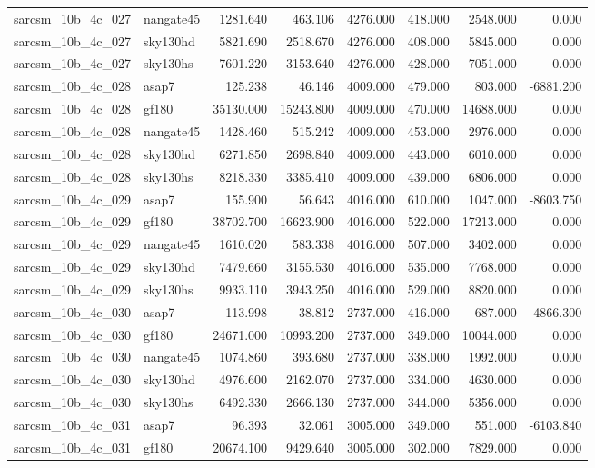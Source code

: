 \begin{tabular}{llrrrrrr}
sarcsm\_10b\_4c\_027 & nangate45 & 1281.640 & 463.106 & 4276.000 & 418.000 & 2548.000 & 0.000 \\
sarcsm\_10b\_4c\_027 & sky130hd & 5821.690 & 2518.670 & 4276.000 & 408.000 & 5845.000 & 0.000 \\
sarcsm\_10b\_4c\_027 & sky130hs & 7601.220 & 3153.640 & 4276.000 & 428.000 & 7051.000 & 0.000 \\
sarcsm\_10b\_4c\_028 & asap7 & 125.238 & 46.146 & 4009.000 & 479.000 & 803.000 & -6881.200 \\
sarcsm\_10b\_4c\_028 & gf180 & 35130.000 & 15243.800 & 4009.000 & 470.000 & 14688.000 & 0.000 \\
sarcsm\_10b\_4c\_028 & nangate45 & 1428.460 & 515.242 & 4009.000 & 453.000 & 2976.000 & 0.000 \\
sarcsm\_10b\_4c\_028 & sky130hd & 6271.850 & 2698.840 & 4009.000 & 443.000 & 6010.000 & 0.000 \\
sarcsm\_10b\_4c\_028 & sky130hs & 8218.330 & 3385.410 & 4009.000 & 439.000 & 6806.000 & 0.000 \\
sarcsm\_10b\_4c\_029 & asap7 & 155.900 & 56.643 & 4016.000 & 610.000 & 1047.000 & -8603.750 \\
sarcsm\_10b\_4c\_029 & gf180 & 38702.700 & 16623.900 & 4016.000 & 522.000 & 17213.000 & 0.000 \\
sarcsm\_10b\_4c\_029 & nangate45 & 1610.020 & 583.338 & 4016.000 & 507.000 & 3402.000 & 0.000 \\
sarcsm\_10b\_4c\_029 & sky130hd & 7479.660 & 3155.530 & 4016.000 & 535.000 & 7768.000 & 0.000 \\
sarcsm\_10b\_4c\_029 & sky130hs & 9933.110 & 3943.250 & 4016.000 & 529.000 & 8820.000 & 0.000 \\
sarcsm\_10b\_4c\_030 & asap7 & 113.998 & 38.812 & 2737.000 & 416.000 & 687.000 & -4866.300 \\
sarcsm\_10b\_4c\_030 & gf180 & 24671.000 & 10993.200 & 2737.000 & 349.000 & 10044.000 & 0.000 \\
sarcsm\_10b\_4c\_030 & nangate45 & 1074.860 & 393.680 & 2737.000 & 338.000 & 1992.000 & 0.000 \\
sarcsm\_10b\_4c\_030 & sky130hd & 4976.600 & 2162.070 & 2737.000 & 334.000 & 4630.000 & 0.000 \\
sarcsm\_10b\_4c\_030 & sky130hs & 6492.330 & 2666.130 & 2737.000 & 344.000 & 5356.000 & 0.000 \\
sarcsm\_10b\_4c\_031 & asap7 & 96.393 & 32.061 & 3005.000 & 349.000 & 551.000 & -6103.840 \\
sarcsm\_10b\_4c\_031 & gf180 & 20674.100 & 9429.640 & 3005.000 & 302.000 & 7829.000 & 0.000 \\

\end{tabular}
